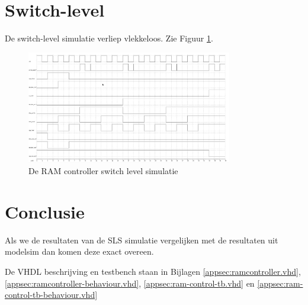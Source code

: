 \documentclass{scrreprt} %
\begin{document}
\section{Switch-level}
De switch-level simulatie verliep vlekkeloos. Zie Figuur \ref{fig:ramcontroller-sl-sim}.
\begin{figure}[H]
\centering
	\includegraphics[width=0.8\textwidth]{resources/wave_sls.png}
	\caption{De RAM controller switch level simulatie}
	\label{fig:ramcontroller-sl-sim}
\end{figure}

\section{Conclusie}
Als we de resultaten van de SLS simulatie vergelijken met de resultaten uit modelsim dan komen deze exact overeen.

De VHDL beschrijving en testbench staan in Bijlagen \ref{appsec:ramcontroller.vhd}, \ref{appsec:ramcontroller-behaviour.vhd}, \ref{appsec:ram-control-tb.vhd} en \ref{appsec:ram-control-tb-behaviour.vhd}
\end{document}

